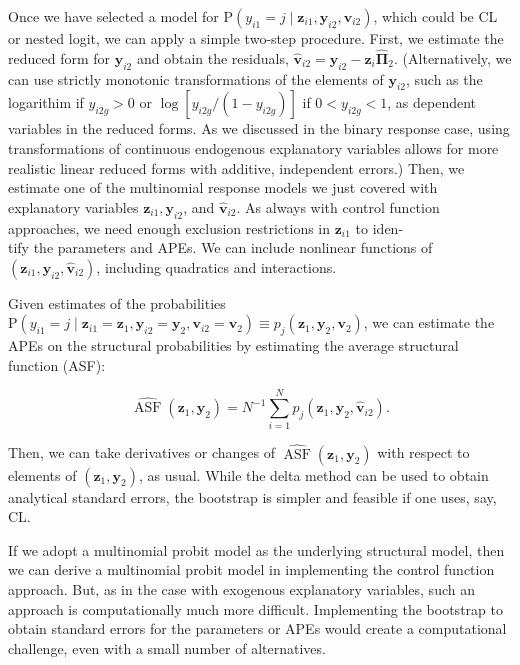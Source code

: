 \documentclass[10pt]{article}
\begin{document}
Once we have selected a model for $\mathrm{P}\left(y_{i 1}=j \mid \mathbf{z}_{i 1}, \mathbf{y}_{i 2}, \mathbf{v}_{i 2}\right)$, which could be CL or nested logit, we can apply a simple two-step procedure. First, we estimate the reduced form for $\mathbf{y}_{i 2}$ and obtain the residuals, $\hat{\mathbf{v}}_{i 2}=\mathbf{y}_{i 2}-\mathbf{z}_{i} \hat{\boldsymbol{\Pi}}_{2}$. (Alternatively, we can use strictly monotonic transformations of the elements of $\mathbf{y}_{i 2}$, such as the logarithim if $y_{i 2 g}>0$ or $\log \left[y_{i 2 g} /\left(1-y_{i 2 g}\right)\right]$ if $0<y_{i 2 g}<1$, as dependent variables in the reduced forms. As we discussed in the binary response case, using transformations of continuous endogenous explanatory variables allows for more realistic linear reduced forms with additive, independent errors.) Then, we estimate one of the multinomial response models we just covered with explanatory variables $\mathbf{z}_{i 1}, \mathbf{y}_{i 2}$, and $\hat{\mathbf{v}}_{i 2}$. As always with control function approaches, we need enough exclusion restrictions in $\mathbf{z}_{i 1}$ to iden-\\
tify the parameters and APEs. We can include nonlinear functions of $\left(\mathbf{z}_{i 1}, \mathbf{y}_{i 2}, \hat{\mathbf{v}}_{i 2}\right)$, including quadratics and interactions.

Given estimates of the probabilities $\mathrm{P}\left(y_{i 1}=j \mid \mathbf{z}_{i 1}=\mathbf{z}_{1}, \mathbf{y}_{i 2}=\mathbf{y}_{2}, \mathbf{v}_{i 2}=\mathbf{v}_{2}\right) \equiv p_{j}\left(\mathbf{z}_{1}, \mathbf{y}_{2}, \mathbf{v}_{2}\right)$, we can estimate the APEs on the structural probabilities by estimating the average structural function (ASF):


\begin{equation*}
\widehat{\operatorname{ASF}}\left(\mathbf{z}_{1}, \mathbf{y}_{2}\right)=N^{-1} \sum_{i=1}^{N} p_{j}\left(\mathbf{z}_{1}, \mathbf{y}_{2}, \hat{\mathbf{v}}_{i 2}\right) . \tag{16.14}
\end{equation*}


Then, we can take derivatives or changes of $\widehat{\operatorname{ASF}}\left(\mathbf{z}_{1}, \mathbf{y}_{2}\right)$ with respect to elements of $\left(\mathbf{z}_{1}, \mathbf{y}_{2}\right)$, as usual. While the delta method can be used to obtain analytical standard errors, the bootstrap is simpler and feasible if one uses, say, CL.

If we adopt a multinomial probit model as the underlying structural model, then we can derive a multinomial probit model in implementing the control function approach. But, as in the case with exogenous explanatory variables, such an approach is computationally much more difficult. Implementing the bootstrap to obtain standard errors for the parameters or APEs would create a computational challenge, even with a small number of alternatives.
\end{document}
